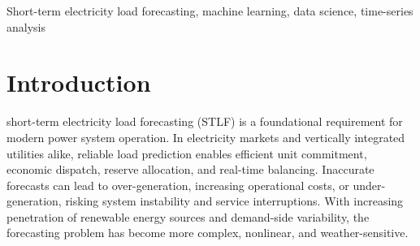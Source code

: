 \documentclass[conference]{IEEEtran}
\begin{document}
\begin{abstract}

Short-term electricity load forecasting (STLF) is essential for reliable grid operation, economic dispatch, and energy management in modern power systems characterized by renewable integration and climate-driven variability. Over the past decades, forecasting methodologies have evolved from traditional statistical techniques to machine learning and deep learning architectures. However, inconsistencies in benchmarking practices, preprocessing pipelines, and weather feature integration limit the interpretability and comparability of reported results. This study presents a structured literature review and proposes a unified comparative evaluation framework for short-term electricity load forecasting. The review synthesizes traditional statistical models, machine learning approaches, and deep learning architectures, with particular emphasis on the integration of meteorological variables. Furthermore, the study highlights the need for systematic weather impact sensitivity analysis to quantify the marginal contribution of environmental features to predictive performance across model classes.

By identifying methodological gaps and inconsistencies in existing studies, this work establishes a reproducible foundation for fair model comparison and weather-aware forecasting design. The proposed framework aims to bridge model performance evaluation with environmental dependency analysis, contributing toward more robust and practically applicable load forecasting systems.

\end{abstract}
\begin{IEEEkeywords}
Short-term electricity load forecasting, machine learning, data science, time-series analysis
\end{IEEEkeywords}

\section{Introduction}
 short-term electricity load forecasting (STLF) is a foundational requirement for modern power system operation. In electricity markets and vertically integrated utilities alike, reliable load prediction enables efficient unit commitment, economic dispatch, reserve allocation, and real-time balancing. Inaccurate forecasts can lead to over-generation, increasing operational costs, or under-generation, risking system instability and service interruptions. With increasing penetration of renewable energy sources and demand-side variability, the forecasting problem has become more complex, nonlinear, and weather-sensitive.
\end{document}
